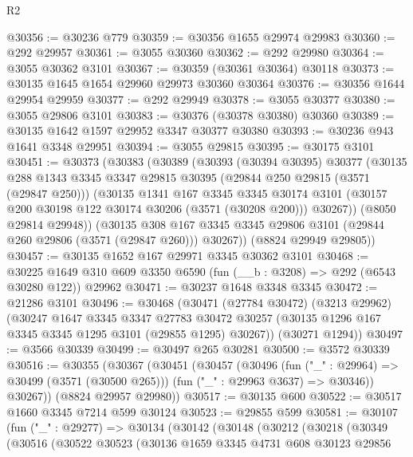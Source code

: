 \begin{lexlean}{R2}
\begin{coremodule}
@30356 := @30236 @779
@30359 := @30356 @1655 @29974 @29983
@30360 := @292 @29957
@30361 := @3055 @30360
@30362 := @292 @29980
@30364 := @3055 @30362 @3101
@30367 := @30359 (@30361 @30364) @30118
@30373 := @30135 @1645 @1654 @29960 @29973 @30360 @30364
@30376 := @30356 @1644 @29954 @29959
@30377 := @292 @29949
@30378 := @3055 @30377
@30380 := @3055 @29806 @3101
@30383 := @30376 (@30378 @30380) @30360
@30389 := @30135 @1642 @1597 @29952 @3347 @30377 @30380
@30393 := @30236 @943 @1641 @3348 @29951
@30394 := @3055 @29815
@30395 := @30175 @3101
@30451 := @30373
    (@30383
      (@30389
        (@30393
          (@30394 @30395)
          @30377
          (@30135
            @288
            @1343
            @3345
            @3347
            @29815
            @30395
            (@29844 @250 @29815 (@3571 (@29847 @250)))
            (@30135
              @1341
              @167
              @3345
              @3345
              @30174
              @3101
              (@30157 @200 @30198 @122 @30174 @30206 (@3571 (@30208 @200)))
              @30267))
          (@8050 @29814 @29948))
        (@30135
          @308
          @167
          @3345
          @3345
          @29806
          @3101
          (@29844 @260 @29806 (@3571 (@29847 @260)))
          @30267))
      (@8824 @29949 @29805))
@30457 := @30135 @1652 @167 @29971 @3345 @30362 @3101
@30468 := @30225 @1649 @310 @609 @3350 @6590 (fun (__b : @3208) => @292 (@6543 @30280 @122)) @29962
@30471 := @30237 @1648 @3348 @3345
@30472 := @21286 @3101
@30496 := @30468
    (@30471
      (@27784 @30472)
      (@3213 @29962)
      (@30247
        @1647
        @3345
        @3347
        @27783
        @30472
        @30257
        (@30135 @1296 @167 @3345 @3345 @1295 @3101 (@29855 @1295) @30267))
      (@30271 @1294))
@30497 := @3566 @30339
@30499 := @30497 @265 @30281
@30500 := @3572 @30339
@30516 := @30355
    (@30367
      (@30451
        (@30457
          (@30496
            (fun ("_" : @29964) => @30499 (@3571 (@30500 @265)))
            (fun ("_" : @29963 @3637) => @30346))
          @30267))
      (@8824 @29957 @29980))
@30517 := @30135 @600
@30522 := @30517 @1660 @3345 @7214 @599 @30124
@30523 := @29855 @599
@30581 := @30107
    (fun ("_" : @29277) =>
    @30134
      (@30142
        (@30148
          (@30212
            (@30218
              (@30349
                (@30516
                  (@30522
                    @30523
                    (@30136
                      @1659
                      @3345
                      @4731
                      @608
                      @30123
                      @29856

\end{coremodule}
\end{lexlean}
